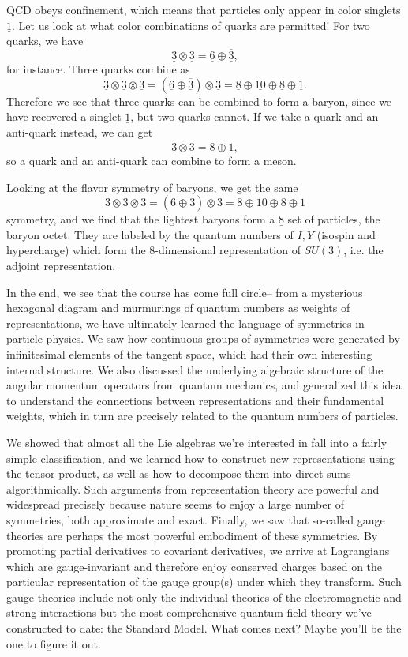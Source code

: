 QCD obeys confinement, which means that particles only appear in color singlets $\underline{1}$. Let us look at what color combinations of quarks are permitted! For two quarks, we have
$$\underline{3} \otimes \underline{3}=\underline{6} \oplus \underline{\overline{3}},$$
for instance. Three quarks combine as
$$\underline{3}\otimes \underline{3}\otimes \underline{3}=(\underline{6} \oplus \underline{\overline{3}}) \otimes \underline{3} = \underline{8} \oplus \underline{10} \oplus \underline{8} \oplus \underline{1}.$$
Therefore we see that three quarks can be combined to form a baryon, since we have recovered a singlet $\underline{1}$, but two quarks cannot. If we take a quark and an anti-quark instead, we can get
$$\underline{3}\otimes \underline{\overline{3}} = \underline{8}\oplus \underline{1},$$
so a quark and an anti-quark can combine to form a meson.

Looking at the flavor symmetry of baryons, we get the same
$$\underline{3}\otimes \underline{3}\otimes \underline{3}=(\underline{6} \oplus \underline{\overline{3}}) \otimes \underline{3} = \underline{8} \oplus \underline{10} \oplus \underline{8} \oplus \underline{1}$$
symmetry, and we find that the lightest baryons form a $\underline{8}$ set of particles, the baryon octet. They are labeled by the quantum numbers of $I,Y$ (isospin and hypercharge) which form the $8$-dimensional representation of $SU(3)$, i.e. the adjoint representation.

In the end, we see that the course has come full circle-- from a mysterious hexagonal diagram and murmurings of quantum numbers as weights of representations, we have ultimately learned the language of symmetries in particle physics. We saw how continuous groups of symmetries were generated by infinitesimal elements of the tangent space, which had their own interesting internal structure. We also discussed the underlying algebraic structure of the angular momentum operators from quantum mechanics, and generalized this idea to understand the connections between representations and their fundamental weights, which in turn are precisely related to the quantum numbers of particles. 

We showed that almost all the Lie algebras we're interested in fall into a fairly simple classification, and we learned how to construct new representations using the tensor product, as well as how to decompose them into direct sums algorithmically. Such arguments from representation theory are powerful and widespread precisely because nature seems to enjoy a large number of symmetries, both approximate and exact. Finally, we saw that so-called gauge theories are perhaps the most powerful embodiment of these symmetries. By promoting partial derivatives to covariant derivatives, we arrive at Lagrangians which are gauge-invariant and therefore enjoy conserved charges based on the particular representation of the gauge group(s) under which they transform. Such gauge theories include not only the individual theories of the electromagnetic and strong interactions but the most comprehensive quantum field theory we've constructed to date: the Standard Model. What comes next? Maybe you'll be the one to figure it out.